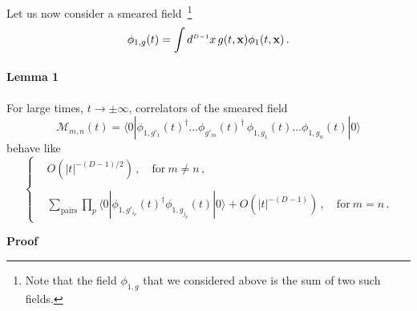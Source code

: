Let us now consider a smeared field~\footnote{Note that the field $\phi_{1,g}$ that we 
considered above is the sum of two such fields.} 
\begin{equation}
    \label{eq:GenericGSmearing}
    \phi_{1,g}(t) = \int d^{\scriptscriptstyle{D-1}}x\, g(t,\mathbf{x}) \phi_{1}(t,\mathbf{x})\, .
\end{equation}

\paragraph{Lemma 1}

For large times, $t\to\pm\infty$, correlators of the smeared field 
\begin{equation}
    \label{eq:SmearedCorrs}
    \mathcal{M}_{m,n}(t) = \langle 0 | \phi_{1,g'_1}(t)^\dagger \ldots \phi_{g'_m}(t)^\dagger \, 
    \phi_{1,g_1}(t) \ldots \phi_{1,g_n}(t) | 0 \rangle
\end{equation}
behave like
\begin{equation}
    \label{eq:LemmaOne}
    \begin{cases}
        & O\left(|t|^{-(D-1)/2}\right)\, , \quad \mathrm{for}\ m\neq n\, , \\
        & \\
        & \sum_\mathrm{pairs} \prod_p 
            \langle 0 | 
            \phi_{1,g'_{i_p}}(t)^\dagger
            \phi_{1,g_{j_p}}(t) 
            | 0\rangle + 
            O\left(|t|^{-(D-1)}\right)\, , \quad \mathrm{for}\ m=n \, .
    \end{cases}
\end{equation}

\noindent
{\bf Proof}\ 

